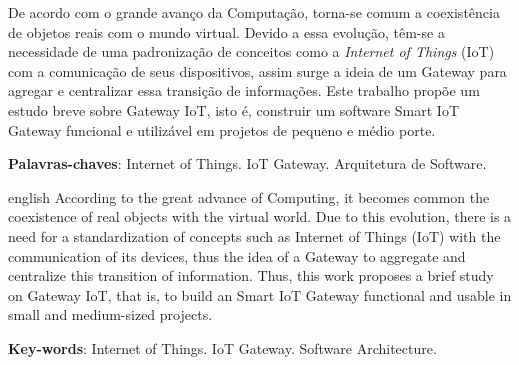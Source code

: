\documentclass[
    article,            %
    11pt,               %
    oneside,            %
    a4paper,            %
    english,            %
    brazil,             %
    sumario=tradicional
    ]{abntex2}
\begin{document}
\frenchspacing 


%
%
\maketitle

\begin{resumoumacoluna}
 De acordo com o grande avanço da Computação, torna-se comum a coexistência de objetos reais com o mundo virtual. Devido a essa evolução, têm-se a necessidade de uma padronização de conceitos como a \textit{Internet of Things} (IoT) com a comunicação de seus dispositivos, assim surge a ideia de um Gateway para agregar e centralizar essa transição de informações. Este trabalho propõe um estudo breve sobre Gateway IoT, isto é, construir um software Smart IoT Gateway funcional e utilizável em projetos de pequeno e médio porte.
 \vspace{\onelineskip}
 
 \noindent
 \textbf{Palavras-chaves}: Internet of Things. IoT Gateway. Arquitetura de Software.
\end{resumoumacoluna}

\renewcommand{\resumoname}{Abstract}
\begin{resumoumacoluna}
	\begin{otherlanguage*}{english}
		According to the great advance of Computing, it becomes common the coexistence of real objects with the virtual world. Due to this evolution, there is a need for a standardization of concepts such as Internet of Things (IoT) with the communication of its devices, thus the idea of a Gateway to aggregate and centralize this transition of information. Thus, this work proposes a brief study on Gateway IoT, that is, to build an Smart IoT Gateway functional and usable in small and medium-sized projects.
		\vspace{\onelineskip}
		\noindent
		
		\textbf{Key-words}: Internet of Things. IoT Gateway. Software Architecture.
	\end{otherlanguage*}  
\end{resumoumacoluna}
\end{document}

